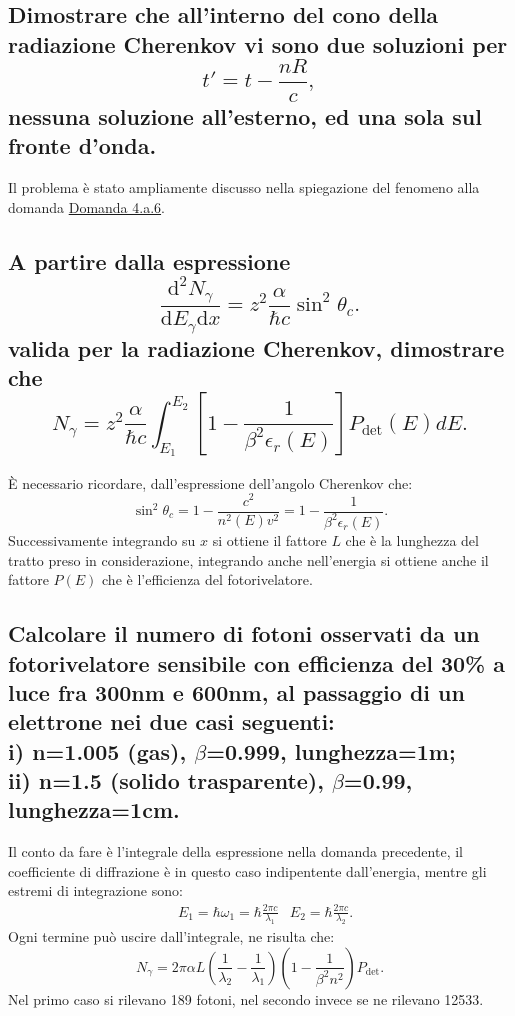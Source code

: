 \subsection[]{Dimostrare che all’interno del cono della radiazione Cherenkov vi sono due soluzioni per 
\[
	t'=t-\frac{nR}{c}
,\] 
nessuna soluzione all’esterno, ed una sola sul fronte d’onda.
}\label{sec:4.b.1}
Il problema è stato ampliamente discusso nella spiegazione del fenomeno alla domanda \hyperref[sec:4.a.6]{Domanda 4.a.6}.

\subsection[]{A partire dalla espressione
\[
	\frac{\mbox{d}^2 N_{\gamma}}{\mbox{d}E_{\gamma}\text{d}x} = z^2 \frac{\alpha}{\hbar c}\sin^2\theta_{c}
.\] 
valida per la radiazione Cherenkov, dimostrare che
\[
	N_{\gamma}=z^2 \frac{\alpha}{\hbar c} \int_{E_1}^{E_2}\left[ 1- \frac{1}{\beta^2 \epsilon_{r}\left( E \right)}\right]P_{\text{det}}\left(E\right) dE
.\] 
}\label{sec:4.b.2}
È necessario ricordare, dall'espressione dell'angolo Cherenkov che:
\[
	\sin^2\theta_{c}=1- \frac{c^2}{n^2\left(E\right)v^2}= 1- \frac{1}{\beta^2 \epsilon_{r}\left( E \right) }
.\] 
Successivamente integrando su $x$ si ottiene il fattore $L$ che è la lunghezza del tratto preso in considerazione, integrando anche nell'energia si ottiene anche il fattore $P\left( E \right)$ che è l'efficienza del fotorivelatore.

\subsection[]{Calcolare il numero di fotoni osservati da un fotorivelatore sensibile con efficienza del 30\% a luce fra 300nm e 600nm, al passaggio di un elettrone nei due casi seguenti: \\
	i) n=1.005 (gas), $\beta$=0.999, lunghezza=1m; \\
	ii) n=1.5 (solido trasparente), $\beta$=0.99, lunghezza=1cm.
}\label{sec:4.b.3}
Il conto da fare è l'integrale della espressione nella domanda precedente, il coefficiente di diffrazione è in questo caso indipentente dall'energia, mentre gli estremi di integrazione sono:
\begin{align*}
	&E_1= \hbar \omega_1= \hbar \frac{2\pi c}{\lambda_1} 	&E_2=\hbar \frac{2\pi c}{\lambda_2}
.\end{align*}
Ogni termine può uscire dall'integrale, ne risulta che:
\[
	N_{\gamma}=2\pi \alpha L \left( \frac{1}{\lambda_2}-\frac{1}{\lambda_1} \right) \left( 1- \frac{1}{\beta^2 n^2} \right) P_{\text{det}}
.\] 
Nel primo caso si rilevano 189 fotoni, nel secondo invece se ne rilevano 12533.

